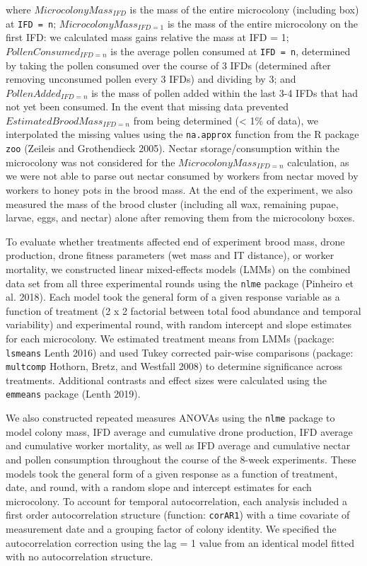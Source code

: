 \documentclass[11pt,]{article}
\begin{document}
where \(Microcolony Mass_{IFD}\) is the mass of the entire microcolony
(including box) at \texttt{IFD\ =\ n}; \(Microcolony Mass_{IFD = 1}\) is
the mass of the entire microcolony on the first IFD: we calculated mass
gains relative the mass at IFD = 1; \(Pollen Consumed_{IFD = n}\) is the
average pollen consumed at \texttt{IFD\ =\ n}, determined by taking the
pollen consumed over the course of 3 IFDs (determined after removing
unconsumed pollen every 3 IFDs) and dividing by 3; and
\(Pollen Added_{IFD = n}\) is the mass of pollen added within the last
3-4 IFDs that had not yet been consumed. In the event that missing data
prevented \(Estimated Brood Mass_{IFD = n}\) from being determined
(\textless{} 1\% of data), we interpolated the missing values using the
\texttt{na.approx} function from the R package \texttt{zoo} (Zeileis and
Grothendieck 2005). Nectar storage/consumption within the microcolony
was not considered for the \(Microcolony Mass_{IFD = n}\) calculation,
as we were not able to parse out nectar consumed by workers from nectar
moved by workers to honey pots in the brood mass. At the end of the
experiment, we also measured the mass of the brood cluster (including
all wax, remaining pupae, larvae, eggs, and nectar) alone after removing
them from the microcolony boxes.

To evaluate whether treatments affected end of experiment brood mass,
drone production, drone fitness parameters (wet mass and IT distance),
or worker mortality, we constructed linear mixed-effects models (LMMs)
on the combined data set from all three experimental rounds using the
\texttt{nlme} package (Pinheiro et al. 2018). Each model took the
general form of a given response variable as a function of treatment (2
x 2 factorial between total food abundance and temporal variability) and
experimental round, with random intercept and slope estimates for each
microcolony. We estimated treatment means from LMMs (package:
\texttt{lsmeans} Lenth 2016) and used Tukey corrected pair-wise
comparisons (package: \texttt{multcomp} Hothorn, Bretz, and Westfall
2008) to determine significance across treatments. Additional contrasts
and effect sizes were calculated using the \texttt{emmeans} package
(Lenth 2019).

We also constructed repeated measures ANOVAs using the \texttt{nlme}
package to model colony mass, IFD average and cumulative drone
production, IFD average and cumulative worker mortality, as well as IFD
average and cumulative nectar and pollen consumption throughout the
course of the 8-week experiments. These models took the general form of
a given response as a function of treatment, date, and round, with a
random slope and intercept estimates for each microcolony. To account
for temporal autocorrelation, each analysis included a first order
autocorrelation structure (function: \texttt{corAR1}) with a time
covariate of measurement date and a grouping factor of colony identity.
We specified the autocorrelation correction using the lag = 1 value from
an identical model fitted with no autocorrelation structure.
\end{document}
